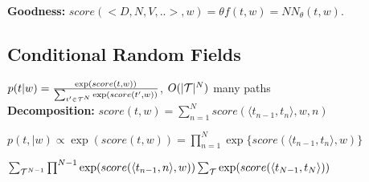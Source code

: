 \textbf{Goodness:} $score(<D,N,V,..>, w) = \theta f(t,w) = NN_\theta(t,w)$.\\
\begin{comment}
	The score function calculates goodness of fit, this is mostly learned by backpropagation.
	The problem comes from the number of paths. 
	Scoring one path is alright, but the normalizer contains $m^n$ paths.\\
\end{comment} 

\subsection{Conditional Random Fields}
$p(t|w) = \frac{\exp(score(t,w))}{\sum_{t' \in \mathcal{T}^N} \exp(score(t',w))}$, $O(|\mathcal{T}|^N)$ many paths\\

\textbf{Decomposition:} $score(t,w) = \sum_{n=1}^N score(\langle t_{n-1}, t_n \rangle, w, n)$\\
\begin{comment}
	Using a score function that is additively decomposable helps with leveraging the structural independence assumption. 
	In this example, we score only bigrams and compute the sum to score a full path.\\
\end{comment} 

$p(t, |w) \propto \exp(score(t,w)) = \prod_{n=1}^N \exp\{ score(\langle t_{n-1}, t_n \rangle, w) \}$\\
\begin{comment}
	The intermediate step is $\exp \sum_{n=1}^N score(\langle t_{n-1}, t_n \rangle, w. n)$.
	This is important as we are generally concerned with probability models, using the additive decomposability and the softmax can be interpreted as probabilities along this path.\\
	We are scoring each arc independently now.\\
\end{comment} 

$\sum_{\mathcal{T}^{N-1}} \prod^{N-1} \exp (score(\langle t_{n-1}, n \rangle, w))\sum_{\mathcal{T}} \exp (score(\langle t_{N-1}, t_N \rangle))$
\begin{comment}
	We have this huge sum over N long sequences in the beginning.
	First step is to calculate the score by multiplying the exponentiated score functions of the bigrams.
	We then divide the sum between the last bigram and the rest.
	The former sum can be pushed (?) through the multiplication.\\
\end{comment} 

